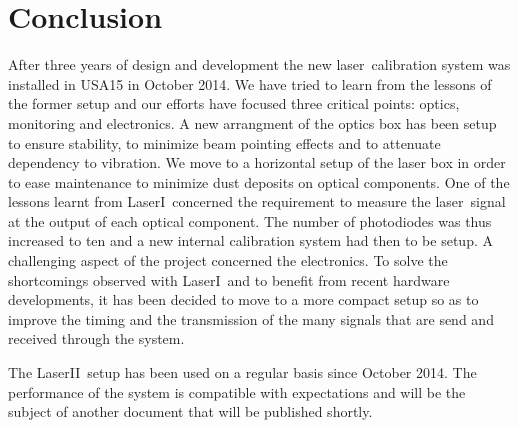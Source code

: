 \documentclass[UKenglish,texlive=2013]{\ATLASLATEXPATH atlasdoc}
\newcommand{\laser}{laser}
\newcommand{\lasi}{LaserI}
\newcommand{\lasii}{LaserII}
\begin{document}
\section{Conclusion}
\label{sec:conclusion}

After three years of design and development the new \laser~calibration system was installed in USA15 in October 2014. We have tried to learn from the lessons of the former setup and our efforts have focused three critical points: optics, monitoring and electronics. A new arrangment of the optics box has been setup to ensure stability, to minimize beam pointing effects and to attenuate dependency to vibration. We move to a horizontal setup of the laser box in order to ease maintenance to minimize dust deposits on optical components.
One of the lessons learnt from \lasi~concerned the requirement to measure the \laser~signal at the output of each optical component. The number of photodiodes was thus increased to ten and a new internal calibration system had then to be setup. A challenging aspect of the project concerned the electronics. To solve the shortcomings observed with \lasi~and to benefit from recent hardware developments, it has been decided to move to a more compact setup so as to improve the timing and the transmission of the many signals that are send and received through the system.

The \lasii~setup has been used on a regular basis since October 2014. The performance of the system is compatible with expectations and will be the subject of another document that will be published shortly.

\begin{comment}
\section*{Acknowledgements}

%

The \texttt{atlaslatex} package contains the acknowledgements that were valid 
at the time of the release you are using.
These can be found in the \texttt{acknowledgements} subdirectory.
When your ATLAS paper or PUB/CONF note is ready to be published,
download the latest set of acknowledgements from:\\
\url{https://twiki.cern.ch/twiki/bin/view/AtlasProtected/PubComAcknowledgements}

The supporting notes for the analysis should also contain a list of contributors.
This information should usually be included in \texttt{mydocument-metadata.tex}.
The list should be printed either here or before the table of contents.
\end{comment}
\end{document}
